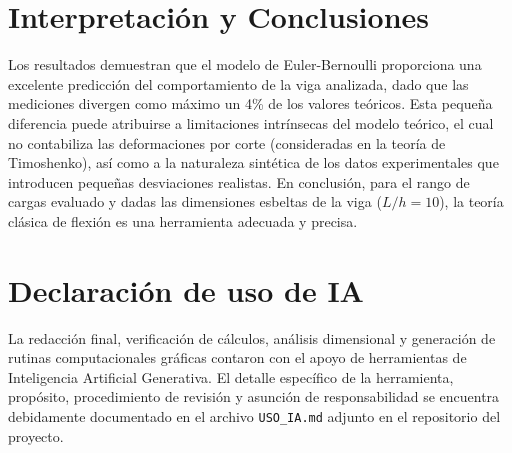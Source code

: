 \documentclass[11pt,a4paper]{article}
\begin{document}
\section{Interpretación y Conclusiones}
Los resultados demuestran que el modelo de Euler-Bernoulli proporciona una excelente predicción del comportamiento de la viga analizada, dado que las mediciones divergen como máximo un 4\% de los valores teóricos. Esta pequeña diferencia puede atribuirse a limitaciones intrínsecas del modelo teórico, el cual no contabiliza las deformaciones por corte (consideradas en la teoría de Timoshenko), así como a la naturaleza sintética de los datos experimentales que introducen pequeñas desviaciones realistas. En conclusión, para el rango de cargas evaluado y dadas las dimensiones esbeltas de la viga ($L/h = 10$), la teoría clásica de flexión es una herramienta adecuada y precisa.

\section{Declaración de uso de IA}
La redacción final, verificación de cálculos, análisis dimensional y generación de rutinas computacionales gráficas contaron con el apoyo de herramientas de Inteligencia Artificial Generativa. El detalle específico de la herramienta, propósito, procedimiento de revisión y asunción de responsabilidad se encuentra debidamente documentado en el archivo \texttt{USO\_IA.md} adjunto en el repositorio del proyecto.


\end{document}
